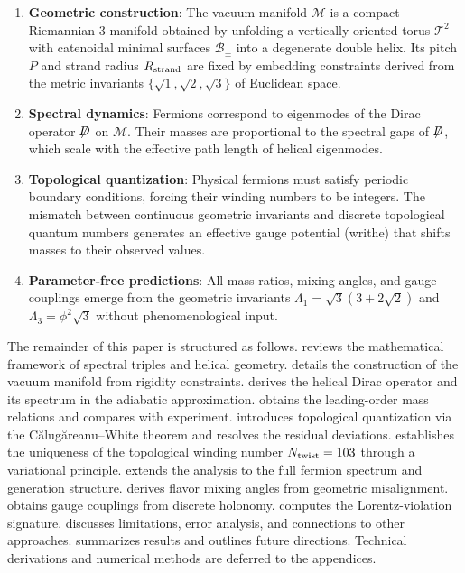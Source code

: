 \documentclass[12pt, a4paper]{article}
\theoremstyle{definition}
\newcommand{\cT}{\mathcal{T}}
\newcommand{\cB}{\mathcal{B}}
\newcommand{\cM}{\mathcal{M}}
\newcommand{\notD}{\not\!\!D}
\newcommand{\Tw}{N_{\rm twist}}
\begin{document}
\begin{enumerate}[label=\textbf{\arabic*.}]
    \item \textbf{Geometric construction}: The vacuum manifold $\cM$ is a compact Riemannian 3-manifold obtained by unfolding a vertically oriented torus $\cT^2$ with catenoidal minimal surfaces $\cB_{\pm}$ into a degenerate double helix. Its pitch $P$ and strand radius $R_{\rm strand}$ are fixed by embedding constraints derived from the metric invariants $\{\sqrt{1},\sqrt{2},\sqrt{3}\}$ of Euclidean space.
    
    \item \textbf{Spectral dynamics}: Fermions correspond to eigenmodes of the Dirac operator $\notD$ on $\cM$. Their masses are proportional to the spectral gaps of $\notD$, which scale with the effective path length of helical eigenmodes.
    
    \item \textbf{Topological quantization}: Physical fermions must satisfy periodic boundary conditions, forcing their winding numbers to be integers. The mismatch between continuous geometric invariants and discrete topological quantum numbers generates an effective gauge potential (writhe) that shifts masses to their observed values.
    
    \item \textbf{Parameter-free predictions}: All mass ratios, mixing angles, and gauge couplings emerge from the geometric invariants $\Lambda_1 = \sqrt{3}(3+2\sqrt{2})$ and $\Lambda_3 = \phi^2\sqrt{3}$ without phenomenological input.
\end{enumerate}

The remainder of this paper is structured as follows.  reviews the mathematical framework of spectral triples and helical geometry.  details the construction of the vacuum manifold from rigidity constraints.  derives the helical Dirac operator and its spectrum in the adiabatic approximation.  obtains the leading-order mass relations and compares with experiment.  introduces topological quantization via the C\u{a}lug\u{a}reanu--White theorem and resolves the residual deviations.  establishes the uniqueness of the topological winding number $\Tw = 103$ through a variational principle.  extends the analysis to the full fermion spectrum and generation structure.  derives flavor mixing angles from geometric misalignment.  obtains gauge couplings from discrete holonomy.  computes the Lorentz-violation signature.  discusses limitations, error analysis, and connections to other approaches.  summarizes results and outlines future directions. Technical derivations and numerical methods are deferred to the appendices.
\end{document}
